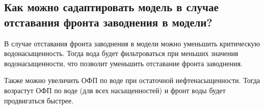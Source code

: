 

\subsection{Как можно садаптировать модель в случае отставания фронта заводнения в модели?}

В случае отставания фронта заводнения в модели можно уменьшить критическую водонасыщенность.
Тогда вода будет фильтроваться при меньших значения водонасыщенности, что позволит уменьшить отставание фронта заводнения.

Также можно увеличить ОФП по воде при остаточной нефтенасыщенности.
Тогда возрастут ОФП по воде (для всех насыщенностей) и фронт воды будет продвигаться быстрее.


